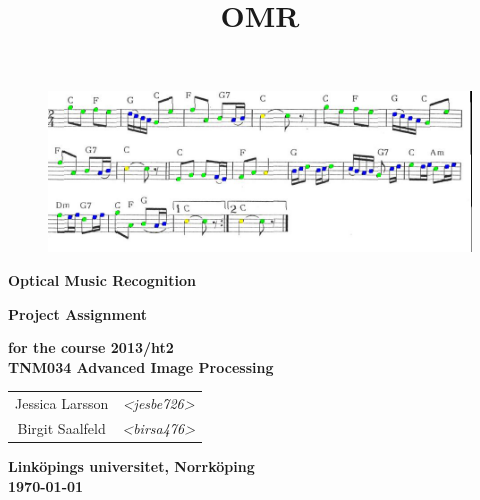 \documentclass[a4paper,12pt]{scrartcl} %
\title{OMR}
\begin{document}
\begin{center}

\begin{figure}[th]
    \centering
		\includegraphics[width=\textwidth]{im1s_compare.jpg}
		\label{fig:logo}
\end{figure}

\vspace{2cm}


{\Huge\bf\sf Optical Music Recognition}

\vspace{.5cm}

{\Huge\bf\sf Project Assignment}

\vspace{.5cm}

{\large\bf\sf for the course 2013/ht2 \\ TNM034 Advanced Image Processing }

\vspace{2cm}

{\Large\bf\sf \begin{tabular}{cc}Jessica Larsson &\textit{<jesbe726>}\\ Birgit Saalfeld &\textit{<birsa476>}\end{tabular}}
\vspace{2cm}

{\Large\bf\sf Link\"{o}pings universitet, Norrk\"{o}ping\\ \today} %

\vspace{\fill}

\end{center}





\end{document}
